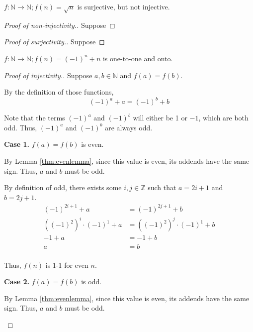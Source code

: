 \documentclass{article}
\begin{document}
\begin{outline}[enumerate]
    \1 $f: \mathbb{N} \rightarrow \mathbb{N}; f(n) = \sqrt{n}$ is surjective, but not injective.
    \begin{proof}[Proof of non-injectivity.]
        Suppose 
    \end{proof}
    \begin{proof}[Proof of surjectivity.]
        Suppose 
    \end{proof}

    \1 $f: \mathbb{N} \rightarrow \mathbb{N}; f(n) = (-1)^n + n$ is one-to-one and onto.

    \begin{proof}[Proof of injectivity.]
        Suppose $a, b \in \mathbb{N}$ and $f(a) = f(b)$.

        By the definition of those functions,
        \begin{equation}
            (-1)^a + a = (-1)^b + b
        \end{equation}

        Note that the terms $(-1)^a$ and $(-1)^b$ will either be 1 or $-1$, which are both odd. Thus, $(-1)^a$ and $(-1)^b$ are always odd.

        \textbf{Case 1.} $f(a) = f(b)$ is even.
        \begin{adjustwidth}{0.5cm}{0.5cm}
            By Lemma \ref{thm:evenlemma}, since this value is even, its addends have the same sign. Thus, $a$ and $b$ must be odd.
            
            By definition of odd, there exists some $i, j \in \mathbb{Z}$ such that $a = 2i + 1$ and $b = 2j + 1$. 
            \begin{equation}
                \begin{aligned}
                    (-1)^{2i + 1} + a &= (-1)^{2j + 1} + b \\
                    ((-1)^2)^i\cdot (-1)^1 + a &= 
                    ((-1)^2)^j\cdot (-1)^1 + b \\
                    -1 + a &= -1 + b \\
                    a &= b \\
                \end{aligned}
            \end{equation}
        
            Thus, $f(n)$ is 1-1 for even $n$.
        \end{adjustwidth}

        \textbf{Case 2.} $f(a) = f(b)$ is odd.
        \begin{adjustwidth}{0.5cm}{0.5cm}
            By Lemma \ref{thm:evenlemma}, since this value is even, its addends have the same sign. Thus, $a$ and $b$ must be odd.
            

\end{adjustwidth}
\end{proof}
\end{outline}
\end{document}
